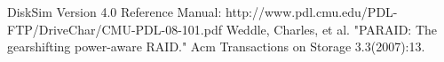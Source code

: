 \documentclass[conference]{IEEEtran}
\begin{document}


%
%
%
\begin{thebibliography}{1}

    DiskSim Version 4.0 Reference Manual: http://www.pdl.cmu.edu/PDL-FTP/DriveChar/CMU-PDL-08-101.pdf
	Weddle, Charles, et al. "PARAID: The gearshifting power-aware RAID." Acm Transactions on Storage 3.3(2007):13.
\end{thebibliography}




\end{document}
